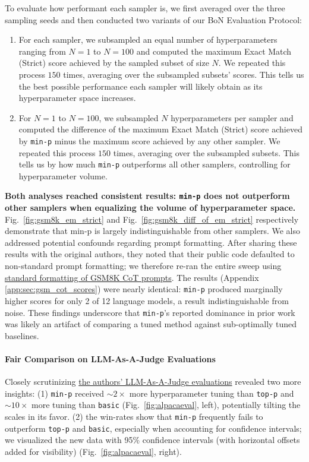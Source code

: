 To evaluate how performant each sampler is, we first averaged over the three sampling seeds and then conducted two variants of our BoN Evaluation Protocol:
\begin{enumerate}
    \item For each sampler, we subsampled an equal number of hyperparameters ranging from $N=1$ to $N=100$ and computed the maximum Exact Match (Strict) score achieved by the sampled subset of size $N$. We repeated this process $150$ times, averaging over the subsampled subsets' scores. This tells us the best possible performance each sampler will likely obtain as its hyperparameter space increases.
    
    \item For $N=1$ to $N=100$, we subsampled $N$ hyperparameters per sampler and computed the difference of the maximum Exact Match (Strict) score achieved by \texttt{min-p} minus the maximum score achieved by any other sampler. We repeated this process $150$ times, averaging over the subsampled subsets. This tells us by how much \texttt{min-p} outperforms all other samplers, controlling for hyperparameter volume.
\end{enumerate}


\textbf{Both analyses reached consistent results: \texttt{min-p} does not outperform other samplers when equalizing the volume of hyperparameter space.}
Fig.~\ref{fig:gsm8k_em_strict} and Fig.~\ref{fig:gsm8k_diff_of_em_strict} respectively demonstrate that min-p is largely indistinguishable from other samplers.
We also addressed potential confounds regarding prompt formatting. After sharing these results with the original authors, they noted that their public code defaulted to non-standard prompt formatting; we therefore re-ran the entire sweep using \href{https://github.com/EleutherAI/lm-evaluation-harness/blob/main/lm_eval/tasks/gsm8k/gsm8k-cot.yaml}{standard formatting of GSM8K CoT prompts}. The results (Appendix \ref{app:sec:gsm_cot_scores}) were nearly identical: \texttt{min-p} produced marginally higher scores for only 2 of 12 language models, a result indistinguishable from noise. These findings underscore that \texttt{min-p}'s reported dominance in prior work was likely an artifact of comparing a tuned method against sub-optimally tuned baselines.

\paragraph{Fair Comparison on LLM-As-A-Judge Evaluations}

Closely scrutinizing \href{https://github.com/IlyaGusev/quest/compare/main...menhguin:quest:main}{the authors' LLM-As-A-Judge evaluations} revealed two more insights: (1) \texttt{min-p} received $\mathord{\sim}2\times$ more hyperparameter tuning than \texttt{top-p} and $\mathord{\sim}10\times$ more tuning than \texttt{basic} (Fig.~\ref{fig:alpacaeval}, left), potentially tilting the scales in its favor. (2) the win-rates show that \texttt{min-p} frequently fails to outperform \texttt{top-p} and \texttt{basic}, especially when accounting for confidence intervals; we visualized the new data with 95\% confidence intervals (with horizontal offsets added for visibility) (Fig.~\ref{fig:alpacaeval}, right).

